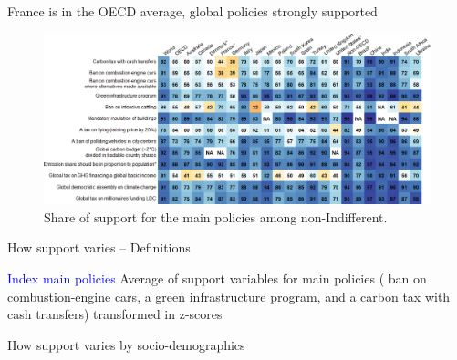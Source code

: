 \begin{framefont}{\small}
\begin{frame}{France is in the OECD average, global policies strongly supported}
	\begin{figure}[h!]
		\centering		
		\caption{Share of support for the main policies among non-Indifferent.}
		\includegraphics[width=\textwidth]{../figures/country_comparison/main_policies_share_countries.png}
		\end{figure}
\end{frame}

\begin{frame}{How support varies -- Definitions}

\bbs
\ip \textcolor{blue}{Index main policies}
\bbs
\ip Average of support variables for main policies ( ban on combustion-engine cars, a green infrastructure program, and a carbon tax with cash transfers) transformed in z-scores
\ee
\ee
\end{frame}

\begin{frame}{How support varies by socio-demographics}


\end{frame}
\end{framefont}
